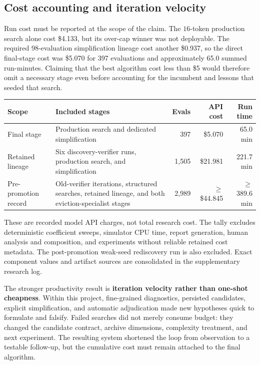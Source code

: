 \documentclass[11pt]{article}
\newcommand{\important}[1]{\textbf{\color{navy}#1}}
\begin{document}
\subsection{Cost accounting and iteration velocity}

Run cost must be reported at the scope of the claim.  The \(16\)-token production
search alone cost \$4.133, but its over-cap winner was not deployable.  The required
98-evaluation simplification lineage cost another \$0.937, so the direct final-stage
cost was \$5.070 for 397 evaluations and approximately 65.0 summed run-minutes.
Claiming that the best algorithm cost less than \$5 would therefore omit a necessary
stage even before accounting for the incumbent and lessons that seeded that search.

\begin{center}
\footnotesize
\begin{tabularx}{\textwidth}{@{}
  >{\raggedright\arraybackslash}p{}
  >{\raggedright\arraybackslash}X
  rrr@{}}
\toprule
\textbf{Scope} & \textbf{Included stages} & \textbf{Evals} &
\textbf{API cost} & \textbf{Run time} \\
\midrule
Final stage &
Production search and dedicated simplification &
397 & \$5.070 & 65.0 min \\
Retained lineage &
Six discovery-verifier runs, production search, and simplification &
1,505 & \$21.981 & 221.7 min \\
Pre-promotion record &
Old-verifier iterations, structured searches, retained lineage, and both
eviction-specialist stages &
2,989 & \(\geq\)\$44.845 & \(\geq\)389.6 min \\
\bottomrule
\end{tabularx}
\end{center}

These are recorded model API charges, not total research cost.  The tally excludes
deterministic coefficient sweeps, simulator CPU time, report generation, human
analysis and composition, and experiments without reliable retained cost metadata.
The post-promotion weak-seed rediscovery run is also excluded.  Exact component values
and artifact sources are consolidated in the supplementary research log.

The stronger productivity result is \important{iteration velocity rather than
one-shot cheapness}.  Within this project, fine-grained diagnostics, persisted
candidates, explicit simplification, and automatic adjudication made new hypotheses
quick to formulate and falsify.  Failed searches did not merely consume budget: they
changed the candidate contract, archive dimensions, complexity treatment, and next
experiment.  The resulting system shortened the loop from observation to a testable
follow-up, but the cumulative cost must remain attached to the final algorithm.
\end{document}
